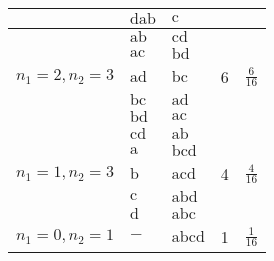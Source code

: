 \begin{enumerate}
\begin{center}
\begin{tabular}{|p{2.5cm}|p{2.7cm}|p{2.5cm}|p{2.7cm}|p{2.5cm}|}
		& $\mathrm{dab}$ & $\mathrm{c}$ & & \\
		\hline
		 &$\mathrm{ab}$&$\mathrm{cd}$ & &\\
		 &$\mathrm{ac}$&$\mathrm{bd}$ & &\\
		 $n_1=2,n_2=3$&$\mathrm{ad}$&$\mathrm{bc}$ &6&$\frac{6}{16}$\\
		 &$\mathrm{bc}$&$\mathrm{ad}$ & &\\
		 &$\mathrm{bd}$&$\mathrm{ac}$ & &\\
		 &$\mathrm{cd}$&$\mathrm{ab}$ & &\\
		 \hline
		  &$\mathrm{a}$&$\mathrm{bcd}$ & &\\
		$n_1=1,n_2=3$&$\mathrm{b}$&$\mathrm{acd}$ &4 &$\frac{4}{16}$\\
		  &$\mathrm{c}$&$\mathrm{abd}$ & &\\
		 &$\mathrm{d}$&$\mathrm{abc}$ & &\\
		  \hline
		  	$n_1=0,n_2=1$&$-$&$\mathrm{abcd}$ &1 &$\frac{1}{16}$\\
		  	 \hline
	\end{tabular}
\end{center}
	
	
	
	
	
	
	
	
	
	
	
	
	
	
	
	
	
	
	
	
	
	
	
	
	
	
	
	
	
	
	
	
	
	
	
	
	
	
	
	
	
	
	
	
\end{enumerate}